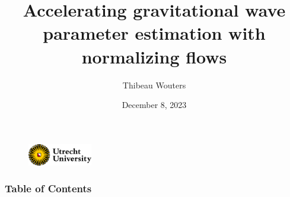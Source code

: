 \documentclass[usenames,dvipsnames,t]{beamer}
\title[ML4GW] %
{Accelerating gravitational wave parameter estimation with normalizing flows}
\author{Thibeau Wouters}
\date{December 8, 2023}
\begin{document}
{


\begin{frame}[plain]
\titlepage

\begin{figure}
\centering
\includegraphics[width=0.25\textwidth]{Figures/utrecht-university.png}
\end{figure}

\end{frame}
}






\begin{frame}
\frametitle{Table of Contents}
\tableofcontents
\end{frame}
\end{document}
